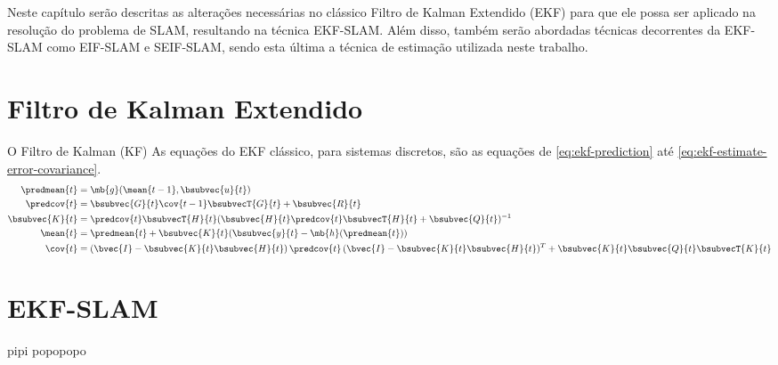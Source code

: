 Neste capítulo serão descritas as alterações necessárias no clássico Filtro de Kalman Extendido (EKF) para que ele possa ser aplicado na resolução do problema de SLAM, resultando na técnica EKF-SLAM. Além disso, também serão abordadas técnicas decorrentes da EKF-SLAM como EIF-SLAM e SEIF-SLAM, sendo esta última a técnica de estimação utilizada neste trabalho.

\section{Filtro de Kalman Extendido}
O Filtro de Kalman (KF)
As equações do EKF clássico, para sistemas discretos, são as equações de \ref{eq:ekf-prediction} até \ref{eq:ekf-estimate-error-covariance}.
\begin{align}
  \predmean{t} &= \mb{g}(\mean{t-1}, \bsubvec{u}{t})
  \label{eq:ekf-prediction}\\
  \predcov{t} &= \bsubvec{G}{t}\cov{t-1}\bsubvecT{G}{t} + \bsubvec{R}{t}
  \label{eq:ekf-prediction-error-covariance}\\
  \bsubvec{K}{t} &=   \predcov{t}\bsubvecT{H}{t} (\bsubvec{H}{t}\predcov{t}\bsubvecT{H}{t} + \bsubvec{Q}{t})^{-1}
  \label{eq:ekk-gain}\\
  \mean{t} &= \predmean{t} + \bsubvec{K}{t}(\bsubvec{y}{t} - \mb{h}(\predmean{t}))
  \label{eq:ekf-update}\\
  \cov{t} &= (\bvec{I} - \bsubvec{K}{t}\bsubvec{H}{t})\,\predcov{t}\,(\bvec{I} - \bsubvec{K}{t}\bsubvec{H}{t})^T + \bsubvec{K}{t}\bsubvec{Q}{t}\bsubvecT{K}{t}
  \label{eq:ekf-estimate-error-covariance}
\end{align}

\section{EKF-SLAM}
pipi popopopo